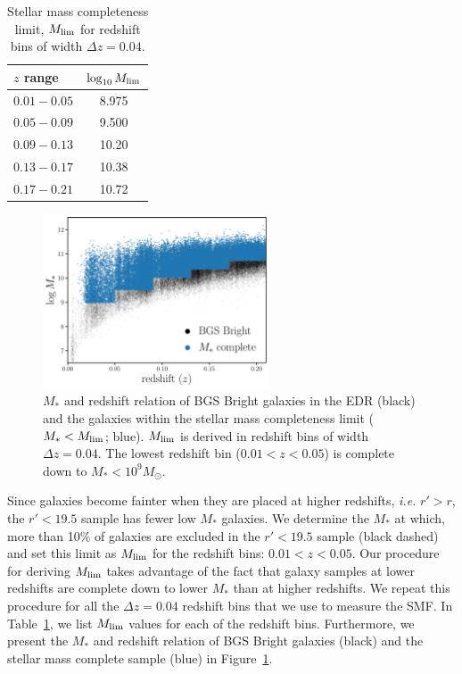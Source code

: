 \begin{table} 
    \caption{Stellar mass completeness limit, $M_{\rm lim}$ for redshift bins
    of width $\Delta z = 0.04$.} 
    \begin{center}
        \begin{tabular}{lc} \toprule
            $z$ range & $\log_{10} M_{\rm lim}$ \\[3pt]
            \hline 
            $0.01 - 0.05$   & 8.975 \\ 
            $0.05 - 0.09$   & 9.500 \\ 
            $0.09 - 0.13$   & 10.20 \\ 
            $0.13 - 0.17$   & 10.38 \\ 
            $0.17 - 0.21$   & 10.72 \\ 
            \hline            
\end{tabular} \label{tab:mscomp}
\end{center}
\end{table}

\begin{figure}[h]
\begin{center}
    \includegraphics[width=0.6\textwidth]{figs/psmf_logMstar_comp_z.pdf}
    \caption{
        $M_*$ and redshift relation of BGS Bright galaxies in the EDR (black)
        and the galaxies within the stellar mass completeness limit ($M_* <
        M_{\rm lim}$; blue). 
        $M_{\rm lim}$ is derived in redshift bins of width $\Delta z = 0.04$. 
        The lowest redshift bin ($0.01 < z < 0.05$) is complete down to 
        $M_* < 10^9 M_\odot$. 
    }\label{fig:ms_comp1}
\end{center}
\end{figure}

Since galaxies become fainter when they are placed at higher redshifts,
\emph{i.e.} $r' > r$, the $r' < 19.5$ sample has fewer low $M_*$ galaxies. 
We determine the $M_*$ at which, more than 10\% of galaxies are excluded in the
$r' < 19.5$ sample (black dashed) and set this limit as $M_{\rm lim}$ for the
redshift bins: $0.01 < z < 0.05$.
Our procedure for deriving $M_{\rm lim}$ takes advantage of the fact that
galaxy samples at lower redshifts are complete down to lower $M_*$ than at
higher redshifts. 
We repeat this procedure for all the $\Delta z = 0.04$ redshift bins that we
use to measure the SMF.
In Table~\ref{tab:mscomp}, we list $M_{\rm lim}$ values for each of the
redshift bins. 
Furthermore, we present the $M_*$ and redshift relation of BGS Bright galaxies
(black) and the stellar mass complete sample (blue) in
Figure~\ref{fig:ms_comp1}. 
